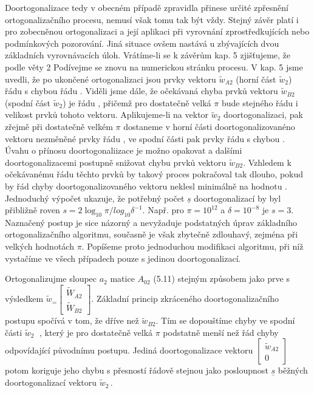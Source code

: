 Doortogonalizace tedy v obecném případě zpravidla přinese určité
zpřesnění ortogonalizačního procesu, nemusí však tomu tak být
vždy. Stejný závěr platí i pro zobecněnou ortogonalizaci a její
aplikaci při vyrovnání zprostředkujících nebo podmínkových
pozorování. Jiná situace ovšem nastává u zbývajících dvou základních
vyrovnávacích úloh. Vrátíme-li se k závěrům kap. 5 zjišťujeme, že
podle věty 2  Podívejme se znovu na numerickou stránku
procesu. V kap. 5 jsme uvedli, že po ukončené ortogonalizaci jsou
prvky vektoru $\widetilde w_{A2}$ (horní část $\widetilde w_2$) řádu
 s chybou řádu \Ocal{\delta}.
%
Viděli jsme dále, že očekávaná chyba prvků vektoru $\widetilde w_{B2}$
(spodní část $\widetilde w_2$) je řádu \Ocal{\pi\delta}, přičemž pro
dostatečně velká $\pi$ bude stejného řádu i velikost prvků tohoto
vektoru.  Aplikujeme-li na vektor $\widetilde w_2$ doortogonalizaci,
pak zřejmě při dostatečně velkém $\pi$ dostaneme v horní části
doortogonalizovanéno vektoru nezměněné prvky řádu , ve
spodní části pak prvky řádu  s chybou
.  Úvahu o přínosu doortogonaliizace je možno
opakovat a dalšími doortogonalizacemi postupně snižovat chybu prvků
vektoru $\widetilde w_{B2}$. Vzhledem k očekávanému řádu
 těchto prvků by takový proces pokračoval tak dlouho,
pokud by řád chyby doortogonalizovaného vektoru neklesl minimálně
%
%
%
na hodnotu  . Jednoduchý výpočet
ukazuje, že potřebný počet $\underline{s}$ doortogonalizací by byl
přibližně roven $s = 2 \log_{10} \pi / log_{10} \delta^{-1}\!$. Např.
pro $\pi = 10^{12}$ a $\delta = 10^{-8}$ je $s=3$. Naznačený
postup je sice názorný a nevyžaduje podstatných úprav
základního ortogonalizačního algoritmu, současně je však zbytečně
zdlouhavý, zejména při velkých hodnotách $\pi$. Popíšeme proto
jednoduchou modifikaci algoritmu, při níž vystačíme ve všech
případech pouze s jedinou doortogonalizací.



Ortogonalizujme sloupec $a_2$ matice $A_{02}$ (5.11) stejným způsobem
jako prve s výsledkem
%
$\widetilde w_ =
\begin{bmatrix}
  \widetilde W_{A2} \\ \widetilde W_{B2}
\end{bmatrix}${.}
%
Základní princip zkráceného doortogonalizačního postupu spočívá v tom,
že dříve než  $\widetilde w_{B2}$. Tím se dopouštíme chyby ve spodní
části $\widetilde w_2\;$ , který je pro dostatečně velká
$\pi$ podstatně menší než řád chyby \Ocal{\pi\delta}
odpovídající původnímu postupu. Jediná doortogonalizace vektoru
%
$\begin{bmatrix} \widetilde w_{A2} \\ 0  \end{bmatrix}$
%
potom koriguje jeho chybu s přesností řádově stejnou jako
posloupnost $\underline s$ běžných doortogonalizací vektoru
%
$\widetilde w_2$\,.




